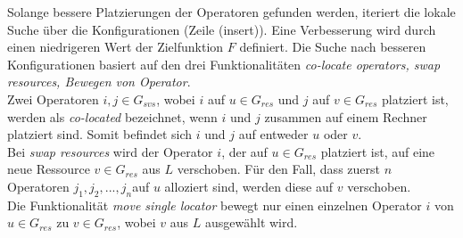 \documentclass{article}
\begin{document}
\noindent
\begin{minipage}{0.55\textwidth}
Solange bessere Platzierungen der Operatoren gefunden werden, iteriert die lokale Suche über die Konfigurationen  (Zeile (insert)). 
Eine Verbesserung wird durch einen niedrigeren Wert der Zielfunktion $F$ definiert. 
Die Suche nach besseren Konfigurationen basiert auf den drei Funktionalitäten \textit{co-locate operators, swap resources, Bewegen von Operator}. \\

    Zwei Operatoren $i,j \in G_{svs}$, wobei $i$ auf $u \in G_{res}$ und $j$ auf $v \in G_{res}$ platziert ist, werden als \textit{co-located} bezeichnet, 
    wenn $i$ und $j$ zusammen auf einem Rechner platziert sind. Somit befindet sich $i$ und $j$ auf entweder $u$ oder $v$.\\
    Bei \textit{swap resources} wird der Operator $i$, der auf $u \in G_{res}$ platziert ist, auf eine neue Ressource $v \in G_{res}$ aus $L$ verschoben. 
    Für den Fall, dass zuerst $n$ Operatoren $j_1, j_2, ..., j_n$auf $u$ alloziert sind, werden diese auf $v$ verschoben. \\ 
    Die Funktionalität \textit{move single locator}  bewegt nur einen einzelnen Operator $i$ von $u \in G_{res}$ zu $v \in G_{res}$, wobei $v$ aus $L$ ausgewählt wird. 

\end{minipage}
\hspace{10pt}
\end{document}
